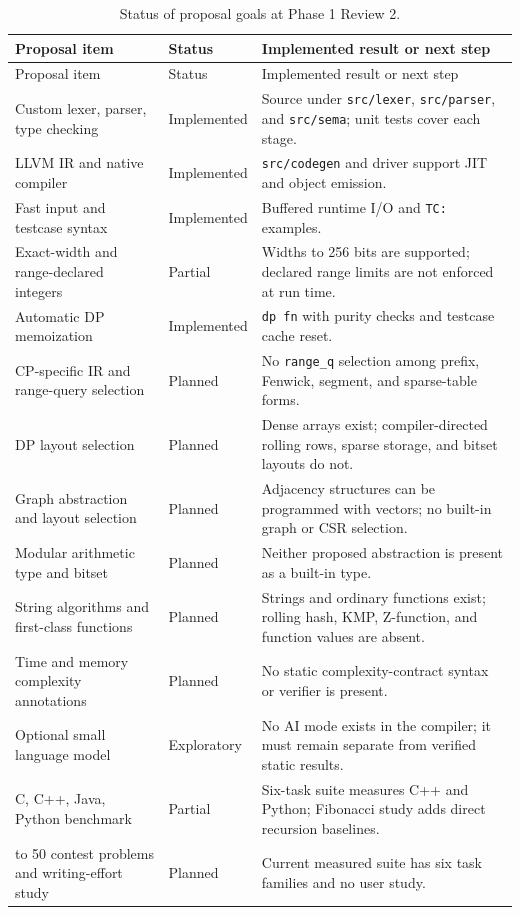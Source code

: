 \documentclass[12pt,a4paper]{report}
\begin{document}
\small
\begin{longtable}{|>{\raggedright\arraybackslash}p{41mm}|>{\raggedright\arraybackslash}p{24mm}|>{\raggedright\arraybackslash}p{63mm}|}
\caption{Status of proposal goals at Phase 1 Review 2.}\label{tab:progress}\\
\hline
Proposal item & Status & Implemented result or next step\\\hline
\endfirsthead
\hline Proposal item & Status & Implemented result or next step\\\hline
\endhead
Custom lexer, parser, type checking & Implemented & Source under \texttt{src/lexer}, \texttt{src/parser}, and \texttt{src/sema}; unit tests cover each stage.\\\hline
LLVM IR and native compiler & Implemented & \texttt{src/codegen} and driver support JIT and object emission.\\\hline
Fast input and testcase syntax & Implemented & Buffered runtime I/O and \texttt{TC:} examples.\\\hline
Exact-width and range-declared integers & Partial & Widths to 256 bits are supported; declared range limits are not enforced at run time.\\\hline
Automatic DP memoization & Implemented & \texttt{dp fn} with purity checks and testcase cache reset.\\\hline
CP-specific IR and range-query selection & Planned & No \texttt{range\_q} selection among prefix, Fenwick, segment, and sparse-table forms.\\\hline
DP layout selection & Planned & Dense arrays exist; compiler-directed rolling rows, sparse storage, and bitset layouts do not.\\\hline
Graph abstraction and layout selection & Planned & Adjacency structures can be programmed with vectors; no built-in graph or CSR selection.\\\hline
Modular arithmetic type and bitset & Planned & Neither proposed abstraction is present as a built-in type.\\\hline
String algorithms and first-class functions & Planned & Strings and ordinary functions exist; rolling hash, KMP, Z-function, and function values are absent.\\\hline
Time and memory complexity annotations & Planned & No static complexity-contract syntax or verifier is present.\\\hline
Optional small language model & Exploratory & No AI mode exists in the compiler; it must remain separate from verified static results.\\\hline
C, C++, Java, Python benchmark & Partial & Six-task suite measures C++ and Python; Fibonacci study adds direct recursion baselines.\\\hline
40 to 50 contest problems and writing-effort study & Planned & Current measured suite has six task families and no user study.\\\hline
\end{longtable}
\normalsize
\end{document}
